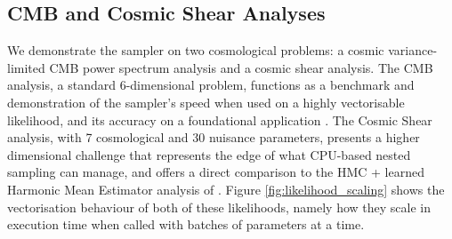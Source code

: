 \documentclass[twocolumn]{openjournal}
\begin{document}
\subsection{CMB and Cosmic Shear Analyses}
We demonstrate the sampler on two cosmological problems: a cosmic variance-limited CMB power spectrum analysis and a cosmic shear analysis. The CMB analysis, a standard 6-dimensional problem, functions as a benchmark and demonstration of the sampler's speed when used on a highly vectorisable likelihood, and its accuracy on a foundational application \citep{planck}. The Cosmic Shear analysis, with 7 cosmological and 30 nuisance parameters, presents a higher dimensional challenge that represents the edge of what CPU-based nested sampling can manage, and offers a direct comparison to the HMC + learned Harmonic Mean Estimator analysis of \cite{Piras_2024}. Figure \ref{fig:likelihood_scaling} shows the vectorisation behaviour of both of these likelihoods, namely how they scale in execution time when called with batches of parameters at a time.
\end{document}
